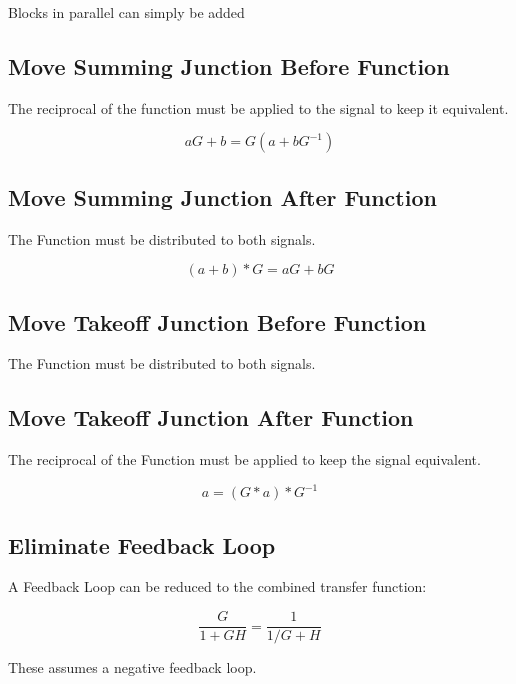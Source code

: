 \documentclass{../templates/topic}
\begin{document}
Blocks in parallel can simply be added

\subsection{Move Summing Junction Before Function}

The reciprocal of the function must be applied to the signal to keep it equivalent.

\begin{equation*}
	aG + b = G(a+bG^{-1})
\end{equation*}

\subsection{Move Summing Junction After Function}

The Function must be distributed to both signals.

\begin{equation*}
	(a+b)*G = aG+bG
\end{equation*}

\subsection{Move Takeoff Junction Before Function}

The Function must be distributed to both signals.

\subsection{Move Takeoff Junction After Function}

The reciprocal of the Function must be applied to keep the signal equivalent.

\begin{equation*}
	a = (G*a)*G^{-1}
\end{equation*}

\subsection{Eliminate Feedback Loop}

A Feedback Loop can be reduced to the combined transfer function:

\begin{equation}
	\frac{G}{1+GH} = \frac{1}{1/G+H}
\end{equation}

These assumes a negative feedback loop.
\end{document}
